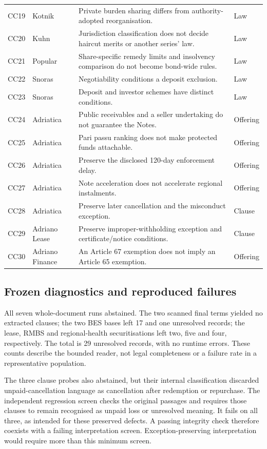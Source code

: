 \documentclass[12pt,a4paper,oneside,openany]{book}
\begin{document}
{\begin{longtable}{P{0.07\textwidth}P{0.18\textwidth}P{0.50\textwidth}P{0.10\textwidth}}
CC19 & Kotnik & Private burden sharing differs from authority-adopted reorganisation. & Law \\
CC20 & Kuhn & Jurisdiction classification does not decide haircut merits or another series' law. & Law \\
CC21 & Popular & Share-specific remedy limits and insolvency comparison do not become bond-wide rules. & Law \\
CC22 & Snoras & Negotiability conditions a deposit exclusion. & Law \\
CC23 & Snoras & Deposit and investor schemes have distinct conditions. & Law \\
CC24 & Adriatica & Public receivables and a seller undertaking do not guarantee the Notes. & Offering \\
CC25 & Adriatica & Pari passu ranking does not make protected funds attachable. & Offering \\
CC26 & Adriatica & Preserve the disclosed 120-day enforcement delay. & Offering \\
CC27 & Adriatica & Note acceleration does not accelerate regional instalments. & Offering \\
CC28 & Adriatica & Preserve later cancellation and the misconduct exception. & Clause \\
CC29 & Adriano Lease & Preserve improper-withholding exception and certificate/notice conditions. & Clause \\
CC30 & Adriano Finance & An Article 67 exemption does not imply an Article 65 exemption. & Offering \\
\bottomrule
\end{longtable}
}

\subsection{Frozen diagnostics and reproduced failures}

All seven whole-document runs abstained. The two scanned final terms yielded
no extracted clauses; the two BES bases left 17 and one unresolved records;
the lease, RMBS and regional-health securitisations left two, five and four,
respectively. The total is 29 unresolved records, with no runtime errors.
These counts describe the bounded reader, not legal completeness or a failure
rate in a representative population.

The three clause probes also abstained, but their internal classification
discarded unpaid-cancellation language as cancellation after redemption or
repurchase. The independent regression screen checks the original passages
and requires those clauses to remain recognised as unpaid loss or unresolved
meaning. It fails on all three, as intended for these preserved defects.
A passing integrity check therefore coexists with a failing interpretation
screen. Exception-preserving interpretation would require more than this
minimum screen.
\end{document}

